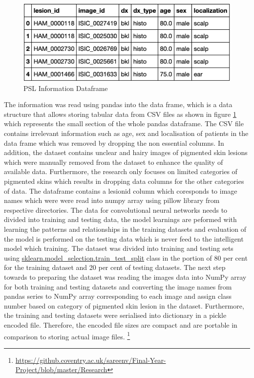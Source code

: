 \begin{figure} [!htp]
    \includegraphics[width=\textwidth]{Images/datae.png}
    \caption{PSL Information Dataframe}
    \label{fig:pandasTop}
\end{figure}

The information was read using pandas into the data frame, 
which is a data structure that allows storing tabular data from CSV files as shown in 
figure \ref{fig:pandasTop} which represents the small section of the whole pandas dataframe. The CSV file contains irrelevant information such as age, sex and localisation 
of patients in the data frame which was removed by dropping the non essential columns.
In addition, the dataset contains unclear and hairy images of pigmented skin lesions which were manually 
removed from the dataset to enhance the quality of available data.
Furthermore, the research only focuses on limited categories of 
pigmented skins which results in dropping data columns for the other categories 
of data. The dataframe contains a lesionid column which coresponds
to image names which were were read into numpy array using pillow library from respective directories.
The data for convolutional neural networks needs to divided into training and testing data, the model learnings
are peformed with learning the patterns and relationships in the training datasets and evaluation of the 
model is performed on the testing data which is never feed to the intelligent model which training.
The dataset was divided into training and testing sets using \url{sklearn.model_selection.train_test_split} class in the portion of 80 per cent for 
the training dataset and 20 per cent of testing datasets. The next step towards to preparing the dataset was reading the images data into NumPy 
array for both training and testing datasets and converting the image names from pandas series to NumPy array corresponding to each image and assign class number 
based on category of pigmented skin lesion in the dataset. Furthermore, the training and testing datasets were serialised into 
dictionary in a pickle encoded file. Therefore, the encoded file sizes are compact and are portable
in comparison to storing actual image files. \footnote{\url{https://github.coventry.ac.uk/sareenv/Final-Year-Project/blob/master/Research}}